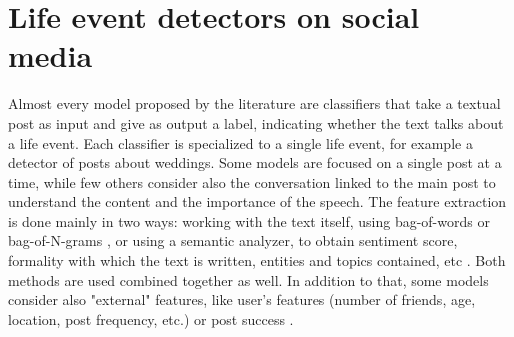 \section{Life event detectors on social media}
\label{sec:socialmediadetectors}
Almost every model proposed by the literature are classifiers that take a textual post as input and give as output a label, indicating whether the text talks about a life event. Each classifier is specialized to a single life event, for example a detector of posts about weddings. Some models are focused on a single post at a time, while few others \cite{cavalin2015multiple, moyanolife} consider also the conversation linked to the main post to understand the content and the importance of the speech. The feature extraction is done mainly in two ways: working with the text itself, using bag-of-words or bag-of-N-grams \cite{cavalinclassification, di2013detecting, li2014major}, or using a semantic analyzer, to obtain sentiment score, formality with which the text is written, entities and topics contained, etc \cite{khobarekar2013detecting}. Both methods are used combined together as well. In addition to that, some models consider also "external" features, like user's features (number of friends, age, location, post frequency, etc.) or post success \cite{dickinson2015identifying}.

